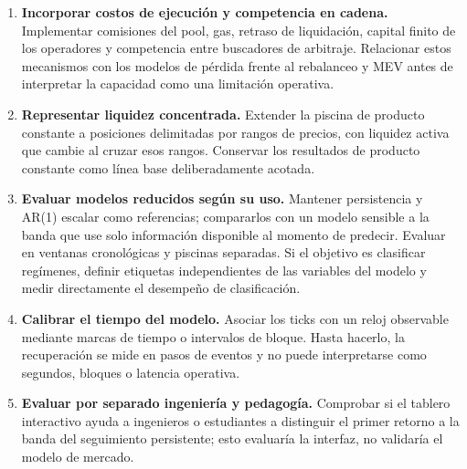 \begin{enumerate}
  \item \textbf{Incorporar costos de ejecución y competencia en cadena.} Implementar comisiones del pool, gas, retraso de liquidación, capital finito de los operadores y competencia entre buscadores de arbitraje. Relacionar estos mecanismos con los modelos de pérdida frente al rebalanceo y MEV antes de interpretar la capacidad como una limitación operativa.
  \item \textbf{Representar liquidez concentrada.} Extender la piscina de producto constante a posiciones delimitadas por rangos de precios, con liquidez activa que cambie al cruzar esos rangos. Conservar los resultados de producto constante como línea base deliberadamente acotada.
  \item \textbf{Evaluar modelos reducidos según su uso.} Mantener persistencia y AR(1) escalar como referencias; compararlos con un modelo sensible a la banda que use solo información disponible al momento de predecir. Evaluar en ventanas cronológicas y piscinas separadas. Si el objetivo es clasificar regímenes, definir etiquetas independientes de las variables del modelo y medir directamente el desempeño de clasificación.
  \item \textbf{Calibrar el tiempo del modelo.} Asociar los ticks con un reloj observable mediante marcas de tiempo o intervalos de bloque. Hasta hacerlo, la recuperación se mide en pasos de eventos y no puede interpretarse como segundos, bloques o latencia operativa.
  \item \textbf{Evaluar por separado ingeniería y pedagogía.} Comprobar si el tablero interactivo ayuda a ingenieros o estudiantes a distinguir el primer retorno a la banda del seguimiento persistente; esto evaluaría la interfaz, no validaría el modelo de mercado.
\end{enumerate}
